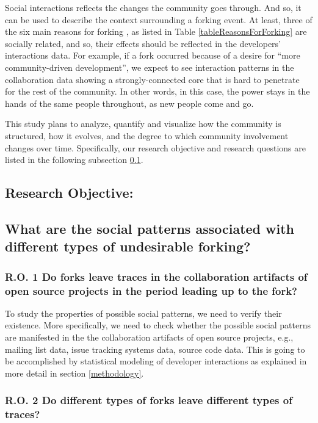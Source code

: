 \documentclass[11pt]{report}
\begin{document}
Social interactions reflects the changes the community goes through. And so, it can be used to describe the context surrounding a forking event. At least, three of the six main reasons for forking \cite{Robles}, as listed in Table \ref{tableReasonsForForking} are socially related, and so, their effects should be reflected in the developers' interactions data. For example, if a fork occurred because of a desire for ``more community-driven development'', we expect to see interaction patterns in the collaboration data showing a strongly-connected core that is hard to penetrate for the rest of the community. In other words, in this case, the power stays in the hands of the same people throughout, as new people come and go. 

This study plans to analyze, quantify and visualize how the community is structured, how it evolves, and the degree to which community involvement changes over time.
Specifically, our research objective and research questions are listed in the following subsection \ref{ResearchObjective}.

\subsection{Research Objective:}
\label{ResearchObjective}
\subsection*{What are the social patterns associated with different types of undesirable forking?\\}

\subsubsection*{R.O. 1 \hspace{4 mm} Do forks leave traces in the collaboration artifacts of open source projects in the period leading up to the fork?\\}

To study the properties of possible social patterns, we need to verify their existence. More specifically, we need to check whether the possible social patterns are manifested in the the collaboration artifacts of open source projects, e.g., mailing list data, issue tracking systems data, source code data. This is going to be accomplished by statistical modeling of developer interactions as explained in more detail in section \ref{methodology}.

\subsubsection*{R.O. 2 \hspace{4 mm} Do different types of forks leave different types of traces?\\}
\end{document}

